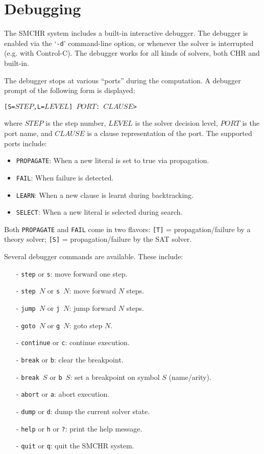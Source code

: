 \documentclass{article}
\begin{document}
\section{Debugging}

The SMCHR system includes a built-in interactive debugger.
The debugger is enabled via the `\texttt{-d}' command-line option, or
whenever the solver is interrupted (e.g. with Control-C).
The debugger works for all kinds of solvers, both CHR and built-in.

The debugger stops at various ``ports'' during the computation.
A debugger prompt of the following form is displayed:
\begin{tabbing}
\texttt{[S=$\mathit{STEP}$,L=$\mathit{LEVEL}$]~$\mathit{PORT}$:~$\mathit{CLAUSE}$>}
\end{tabbing}
where $\mathit{STEP}$ is the step number,
$\mathit{LEVEL}$ is the solver decision level,
$\mathit{PORT}$ is the port name, and
$\mathit{CLAUSE}$ is a clause representation of the port.
The supported ports include:
\begin{itemize}[noitemsep,topsep=0pt,parsep=0pt,partopsep=0pt]
\item \texttt{PROPAGATE}: When a new literal is set to true via propagation.
\item \texttt{FAIL}: When failure is detected.
\item \texttt{LEARN}: When a new clause is learnt during backtracking.
\item \texttt{SELECT}: When a new literal is selected during search.
\end{itemize}
Both \texttt{PROPAGATE} and \texttt{FAIL} come in two flavors:
\texttt{[T]} = propagation/failure by a theory solver;
\texttt{[S]} = propagation/failure by the SAT solver.

Several debugger commands are available.
These include:
\begin{itemize}[noitemsep,topsep=0pt,parsep=0pt,partopsep=0pt]
\item[-] \texttt{step} or \texttt{s}: move forward one step.
\item[-] \texttt{step $N$} or \texttt{s $N$}: move forward $N$ steps.
\item[-] \texttt{jump $N$} or \texttt{j $N$}: jump forward $N$ steps.
\item[-] \texttt{goto $N$} or \texttt{g $N$}: goto step $N$.
\item[-] \texttt{continue} or \texttt{c}: continue execution.
\item[-] \texttt{break} or \texttt{b}: clear the breakpoint.
\item[-] \texttt{break $S$} or \texttt{b $S$}: set a breakpoint on symbol $S$
    (name/arity).
\item[-] \texttt{abort} or \texttt{a}: abort execution.
\item[-] \texttt{dump} or \texttt{d}: dump the current solver state.
\item[-] \texttt{help} or \texttt{h} or \texttt{?}: print the help message.
\item[-] \texttt{quit} or \texttt{q}: quit the SMCHR system.
\end{itemize}
\end{document}
